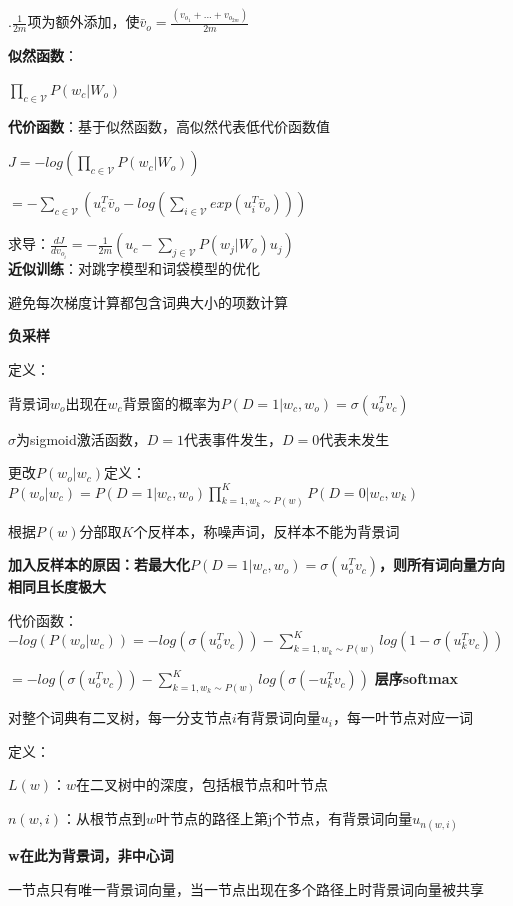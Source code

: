 \documentclass[UTF8]{ctexart}
\begin{document}
  .$\frac{1}{2m}$项为额外添加，使$\bar{v}_o = \frac{(v_{o_1} + ... + v_{o_{2m}})}{2m}$
  
  \textbf{似然函数}：

  \quad $\prod_{c \in \mathcal{V} } P(w_c | W_o)$

  \textbf{代价函数}：基于似然函数，高似然代表低代价函数值

  \quad $J = -log(\prod_{c \in \mathcal{V} } P(w_c | W_o))$

  \quad \quad $= -\sum_{c \in \mathcal{V} } (u_c^T\bar{v}_o - log(\sum_{i\in \mathcal{V} } exp(u_i^T\bar{v}_o )))$

  \quad 求导：$\frac{d J}{d v_{o_i}} = -\frac{1}{2m}(u_c - \sum_{j \in \mathcal{V} }P(w_j | W_o)u_j)$\\
\textbf{近似训练}：对跳字模型和词袋模型的优化

  避免每次梯度计算都包含词典大小的项数计算

  \textbf{负采样}

  \quad 定义：

  \quad \quad 背景词$w_o$出现在$w_c$背景窗的概率为$P(D = 1|w_c, w_o) = \sigma(u_o^Tv_c)$

  \quad \quad \quad $\sigma$为sigmoid激活函数，$D = 1$代表事件发生，$D = 0$代表未发生

  \quad 更改$P(w_o | w_c)$定义：$P(w_o | w_c) = P(D = 1| w_c, w_o)\prod_{k=1, w_k \sim P(w)}^{K}P(D = 0 | w_c, w_k)$

  \quad \quad 根据$P(w)$分部取$K$个反样本，称噪声词，反样本不能为背景词

  \quad \quad \textbf{加入反样本的原因：若最大化$P(D = 1|w_c, w_o) = \sigma(u_o^Tv_c)$，则所有词向量方向相同且长度极大}

  \quad 代价函数：$-log(P(w_o | w_c)) = -log(\sigma(u_o^Tv_c)) - \sum_{k=1, w_k \sim P(w)}^{K}log(1-\sigma(u_k^Tv_c))$

  \quad \quad $ = -log(\sigma(u_o^Tv_c)) - \sum_{k=1, w_k \sim P(w)}^{K}log(\sigma(-u_k^Tv_c))$
  \textbf{层序softmax}
  
  \quad 对整个词典有二叉树，每一分支节点$i$有背景词向量$u_i$，每一叶节点对应一词

  \quad 定义：

  \quad \quad $L(w)$：$w$在二叉树中的深度，包括根节点和叶节点

  \quad \quad $n(w, i)$：从根节点到$w$叶节点的路径上第j个节点，有背景词向量$u_{n(w, i)}$

  \quad \quad \quad \textbf{w在此为背景词，非中心词}

  \quad \quad \quad 一节点只有唯一背景词向量，当一节点出现在多个路径上时背景词向量被共享
\end{document}
